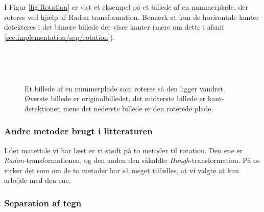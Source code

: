 I Figur \vref{fig:Rotation} er vist et eksempel på et billede af en nummerplade, der roteres ved hjælp af Radon transformation. Bemærk at kun de horisontale kanter detekteres i det binære billede der viser kanter (mere om dette i afsnit \vref{sec:implementation/sep/rotation}).

\begin{figure}[htp]
  \centering
  \begin{minipage}[c]{6 cm}
  \end{minipage}\\
  \begin{minipage}[c]{6 cm}
  \end{minipage}\\
  \begin{minipage}[c]{6 cm}
  \end{minipage}
  \caption{Et billede af en nummerplade som roteres så den ligger vandret. Øverste billede er originalbilledet, det midterste billede er kant-detektionen mens det nederste billede er den roterede plade.}
  \label{fig:Rotation}
\end{figure}

\subsubsection*{Andre metoder brugt i litteraturen}
I det materiale vi har læst er vi stødt på to metoder til rotation. Den ene er \textit{Radon}-transformationen, og den anden den såkaldte \textit{Hough}-transformation. På os virker det som om de to metoder har så meget tilfælles, at vi valgte at kun arbejde med den ene.


\subsubsection{Separation af tegn}

